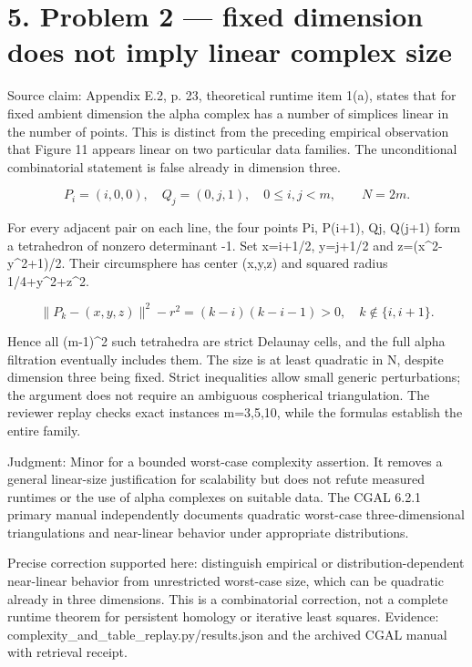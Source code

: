 \documentclass[10pt]{article}
\begin{document}
\section*{5. Problem 2 — fixed dimension does not imply linear complex size}
Source claim: Appendix E.2, p. 23, theoretical runtime item 1(a), states that for fixed ambient dimension the alpha complex has a number of simplices linear in the number of points. This is distinct from the preceding empirical observation that Figure 11 appears linear on two particular data families. The unconditional combinatorial statement is false already in dimension three.\par
\[P_i=(i,0,0),\quad Q_j=(0,j,1),\quad 0\le i,j<m,\qquad N=2m.\]\par
For every adjacent pair on each line, the four points Pi, P(i+1), Qj, Q(j+1) form a tetrahedron of nonzero determinant -1. Set x=i+1/2, y=j+1/2 and z=(x\textasciicircum{}2-y\textasciicircum{}2+1)/2. Their circumsphere has center (x,y,z) and squared radius 1/4+y\textasciicircum{}2+z\textasciicircum{}2.\par
\[\|P_k-(x,y,z)\|^2-r^2=(k-i)(k-i-1)>0,\quad k\notin\{i,i+1\}.\]\par
Hence all (m-1)\textasciicircum{}2 such tetrahedra are strict Delaunay cells, and the full alpha filtration eventually includes them. The size is at least quadratic in N, despite dimension three being fixed. Strict inequalities allow small generic perturbations; the argument does not require an ambiguous cospherical triangulation. The reviewer replay checks exact instances m=3,5,10, while the formulas establish the entire family.\par
Judgment: Minor for a bounded worst-case complexity assertion. It removes a general linear-size justification for scalability but does not refute measured runtimes or the use of alpha complexes on suitable data. The CGAL 6.2.1 primary manual independently documents quadratic worst-case three-dimensional triangulations and near-linear behavior under appropriate distributions.\par
Precise correction supported here: distinguish empirical or distribution-dependent near-linear behavior from unrestricted worst-case size, which can be quadratic already in three dimensions. This is a combinatorial correction, not a complete runtime theorem for persistent homology or iterative least squares. Evidence: complexity\_and\_table\_replay.py/results.json and the archived CGAL manual with retrieval receipt.\par
\end{document}
